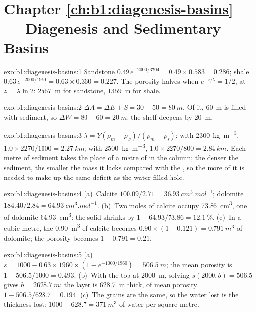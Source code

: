 \section*{Chapter \ref{ch:b1:diagenesis-basins} --- Diagenesis and Sedimentary Basins}

\begin{solution}{exo:b1:diagenesis-basins:1}
Sandstone $0.49\,e^{-2000/3704} = 0.49\times0.583 = \num{0.286}$; shale
$0.63\,e^{-2000/1960} = 0.63\times0.360 = \num{0.227}$. The porosity halves when
$e^{-z/\lambda} = 1/2$, at $z = \lambda\ln 2$: \qty{2567}{m} for sandstone,
\qty{1359}{m} for shale.
\end{solution}

\begin{solution}{exo:b1:diagenesis-basins:2}
$\Delta A = \Delta E + S = 30 + 50 = \qty{80}{m}$. Of it, \qty{60}{m} is filled
with sediment, so $\Delta W = 80 - 60 = \qty{20}{m}$: the shelf deepens by
\qty{20}{m}.
\end{solution}

\begin{solution}{exo:b1:diagenesis-basins:3}
$h = Y(\rho_m - \rho_w)/(\rho_m - \rho_s)$: with \qty{2300}{kg.m^{-3}},
$1.0\times2270/1000 = \qty{2.27}{km}$; with \qty{2500}{kg.m^{-3}},
$1.0\times2270/800 = \qty{2.84}{km}$. Each metre of sediment takes the place of
a metre of  in the column; the denser the sediment, the smaller the mass
it lacks compared with the , so the more of it is needed to make up the
same deficit as the water-filled hole.
\end{solution}

\begin{solution}{exo:b1:diagenesis-basins:4}
(a)~Calcite $100.09/2.71 = \qty{36.93}{cm^3.mol^{-1}}$; dolomite $184.40/2.84
= \qty{64.93}{cm^3.mol^{-1}}$. (b)~Two moles of calcite occupy
\qty{73.86}{cm^3}, one of dolomite \qty{64.93}{cm^3}: the solid shrinks by
$1 - 64.93/73.86 = \qty{12.1}{\%}$. (c)~In a cubic metre, the \qty{0.90}{m^3}
of calcite becomes $0.90\times(1 - 0.121) = \qty{0.791}{m^3}$ of dolomite; the
porosity becomes $1 - 0.791 = \num{0.21}$.
\end{solution}

\begin{solution}{exo:b1:diagenesis-basins:5}
(a)~$s = 1000 - 0.63\times1960\times(1 - e^{-1000/1960}) = \qty{506.5}{m}$; the
mean porosity is $1 - 506.5/1000 = \num{0.493}$. (b)~With the top at
\qty{2000}{m}, solving $s(2000, b) = 506.5$ gives $b = \qty{2628.7}{m}$: the
layer is \qty{628.7}{m} thick, of mean porosity $1 - 506.5/628.7 = \num{0.194}$.
(c)~The grains are the same, so the water lost is the thickness lost:
$1000 - 628.7 = \qty{371}{m^3}$ of water per square metre.
\end{solution}

